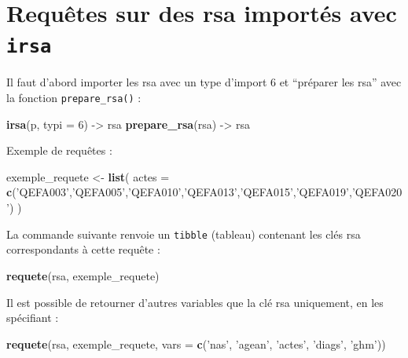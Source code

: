 \documentclass[]{book}
\newenvironment{Shaded}{\begin{snugshade}}{\end{snugshade}}
\newcommand{\KeywordTok}[1]{\textcolor[rgb]{0.13,0.29,0.53}{\textbf{#1}}}
\newcommand{\DataTypeTok}[1]{\textcolor[rgb]{0.13,0.29,0.53}{#1}}
\newcommand{\DecValTok}[1]{\textcolor[rgb]{0.00,0.00,0.81}{#1}}
\newcommand{\StringTok}[1]{\textcolor[rgb]{0.31,0.60,0.02}{#1}}
\newcommand{\NormalTok}[1]{#1}
\theoremstyle{definition}
\theoremstyle{definition}
\theoremstyle{definition}
\theoremstyle{remark}
\begin{document}
\section{\texorpdfstring{Requêtes sur des rsa importés avec
\texttt{irsa}}{Requêtes sur des rsa importés avec irsa}}\label{requetes-sur-des-rsa-importes-avec-irsa}

Il faut d'abord importer les rsa avec un type d'import 6 et ``préparer
les rsa'' avec la fonction \texttt{prepare\_rsa()} :

\begin{Shaded}
\begin{Highlighting}[]
\KeywordTok{irsa}\NormalTok{(p, }\DataTypeTok{typi =} \DecValTok{6}\NormalTok{) ->}\StringTok{ }\NormalTok{rsa}
\KeywordTok{prepare_rsa}\NormalTok{(rsa) ->}\StringTok{ }\NormalTok{rsa}
\end{Highlighting}
\end{Shaded}

Exemple de requêtes :

\begin{Shaded}
\begin{Highlighting}[]
\NormalTok{exemple_requete <-}\StringTok{ }\KeywordTok{list}\NormalTok{(}
  \DataTypeTok{actes =} \KeywordTok{c}\NormalTok{(}\StringTok{'QEFA003'}\NormalTok{,}\StringTok{'QEFA005'}\NormalTok{,}\StringTok{'QEFA010'}\NormalTok{,}\StringTok{'QEFA013'}\NormalTok{,}\StringTok{'QEFA015'}\NormalTok{,}\StringTok{'QEFA019'}\NormalTok{,}\StringTok{'QEFA020'}\NormalTok{)}
\NormalTok{)}
\end{Highlighting}
\end{Shaded}

La commande suivante renvoie un \texttt{tibble} (tableau) contenant les
clés rsa correspondants à cette requête :

\begin{Shaded}
\begin{Highlighting}[]
\KeywordTok{requete}\NormalTok{(rsa, exemple_requete)}
\end{Highlighting}
\end{Shaded}

Il est possible de retourner d'autres variables que la clé rsa
uniquement, en les spécifiant :

\begin{Shaded}
\begin{Highlighting}[]
\KeywordTok{requete}\NormalTok{(rsa, exemple_requete, }\DataTypeTok{vars =} \KeywordTok{c}\NormalTok{(}\StringTok{'nas'}\NormalTok{, }\StringTok{'agean'}\NormalTok{, }\StringTok{'actes'}\NormalTok{, }\StringTok{'diags'}\NormalTok{, }\StringTok{'ghm'}\NormalTok{))}
\end{Highlighting}
\end{Shaded}
\end{document}

